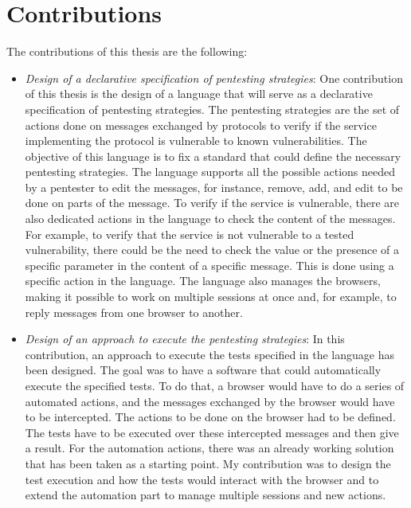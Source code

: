 \section{Contributions}
\label{sec:contributions}
The contributions of this thesis are the following:
\begin{itemize}
    \item \textit{Design of a declarative specification of pentesting strategies}: One contribution of this thesis is the design of a language that will serve as a declarative specification of pentesting strategies. The pentesting strategies are the set of actions done on messages exchanged by protocols to verify if the service implementing the protocol is vulnerable to known vulnerabilities. The objective of this language is to fix a standard that could define the necessary pentesting strategies. The language supports all the possible actions needed by a pentester to edit the messages, for instance, remove, add, and edit to be done on parts of the message. To verify if the service is vulnerable, there are also dedicated actions in the language to check the content of the messages. For example, to verify that the service is not vulnerable to a tested vulnerability, there could be the need to check the value or the presence of a specific parameter in the content of a specific message. This is done using a specific action in the language. The language also manages the browsers, making it possible to work on multiple sessions at once and, for example, to reply messages from one browser to another.
    \item \textit{Design of an approach to execute the pentesting strategies}: In this contribution, an approach to execute the tests specified in the language has been designed. The goal was to have a software that could automatically execute the specified tests. To do that, a browser would have to do a series of automated actions, and the messages exchanged by the browser would have to be intercepted. The actions to be done on the browser had to be defined. The tests have to be executed over these intercepted messages and then give a result. For the automation actions, there was an already working solution \cite{wendy_barreto, claudio_grisenti} that has been taken as a starting point. My contribution was to design the test execution and how the tests would interact with the browser and to extend the automation part to manage multiple sessions and new actions.

\end{itemize}

